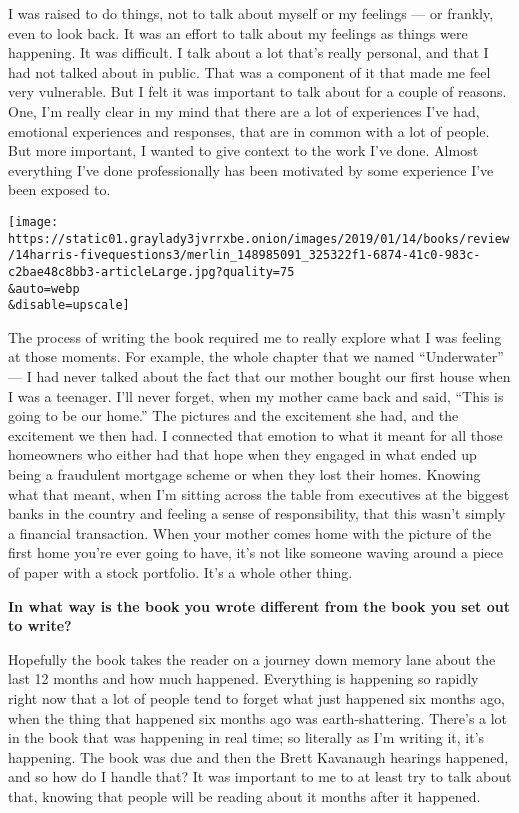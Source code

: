 I was raised to do things, not to talk about myself or my feelings ---
or frankly, even to look back. It was an effort to talk about my
feelings as things were happening. It was difficult. I talk about a lot
that's really personal, and that I had not talked about in public. That
was a component of it that made me feel very vulnerable. But I felt it
was important to talk about for a couple of reasons. One, I'm really
clear in my mind that there are a lot of experiences I've had, emotional
experiences and responses, that are in common with a lot of people. But
more important, I wanted to give context to the work I've done. Almost
everything I've done professionally has been motivated by some
experience I've been exposed to.

\texttt{[image: https://static01.graylady3jvrrxbe.onion/images/2019/01/14/books/review/14harris-fivequestions3/merlin\_148985091\_325322f1-6874-41c0-983c-c2bae48c8bb3-articleLarge.jpg?quality=75\\\&auto=webp\\\&disable=upscale]}

The process of writing the book required me to really explore what I was
feeling at those moments. For example, the whole chapter that we named
``Underwater'' --- I had never talked about the fact that our mother
bought our first house when I was a teenager. I'll never forget, when my
mother came back and said, ``This is going to be our home.'' The
pictures and the excitement she had, and the excitement we then had. I
connected that emotion to what it meant for all those homeowners who
either had that hope when they engaged in what ended up being a
fraudulent mortgage scheme or when they lost their homes. Knowing what
that meant, when I'm sitting across the table from executives at the
biggest banks in the country and feeling a sense of responsibility, that
this wasn't simply a financial transaction. When your mother comes home
with the picture of the first home you're ever going to have, it's not
like someone waving around a piece of paper with a stock portfolio. It's
a whole other thing.

\textbf{In what way is the book you wrote different from the book you
set out to write?}

Hopefully the book takes the reader on a journey down memory lane about
the last 12 months and how much happened. Everything is happening so
rapidly right now that a lot of people tend to forget what just happened
six months ago, when the thing that happened six months ago was
earth-shattering. There's a lot in the book that was happening in real
time; so literally as I'm writing it, it's happening. The book was due
and then the Brett Kavanaugh hearings happened, and so how do I handle
that? It was important to me to at least try to talk about that, knowing
that people will be reading about it months after it happened.

